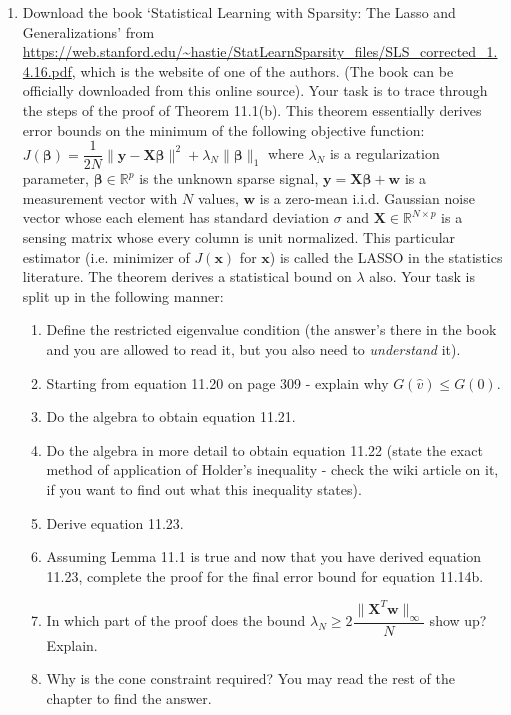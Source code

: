 \documentclass[11pt]{article}
\begin{document}
\begin{enumerate}
\item Download the book `Statistical Learning with Sparsity: The Lasso and Generalizations' from \url{https://web.stanford.edu/~hastie/StatLearnSparsity_files/SLS_corrected_1.4.16.pdf}, which is the website of one of the authors. (The book can be officially downloaded from this online source). Your task is to trace through the steps of the proof of Theorem 11.1(b). This theorem essentially derives error bounds on the minimum of the following objective function: $J(\boldsymbol{\beta}) = \dfrac{1}{2N} \|\boldsymbol{y} - \boldsymbol{X \beta}\|^2 + \lambda_N \|\boldsymbol{\beta}\|_1$ where $\lambda_N$ is a regularization parameter, $\boldsymbol{\beta} \in \mathbb{R}^p$ is the unknown sparse signal, $\boldsymbol{y} = \boldsymbol{X \beta} + \boldsymbol{w}$ is a measurement vector with $N$ values, $\boldsymbol{w}$ is a zero-mean i.i.d. Gaussian noise vector whose each element has standard deviation $\sigma$ and $\boldsymbol{X} \in \mathbb{R}^{N \times p}$ is a sensing matrix whose every column is unit normalized. This particular estimator (i.e. minimizer of $J(\boldsymbol{x})$ for $\boldsymbol{x}$) is called the LASSO in the statistics literature. The theorem derives a statistical bound on $\lambda$ also. Your task is split up in the following manner:
\begin{enumerate}
\item Define the restricted eigenvalue condition (the answer's there in the book and you are allowed to read it, but you also need to \emph{understand} it). 
\item Starting from equation 11.20 on page 309 - explain why $G(\hat{v}) \leq G(0)$.
\item Do the algebra to obtain equation 11.21.
\item Do the algebra in more detail to obtain equation 11.22 (state the exact method of application of Holder's inequality - check the wiki article on it, if you want to find out what this inequality states).
\item Derive equation 11.23.
\item Assuming Lemma 11.1 is true and now that you have derived equation 11.23, complete the proof for the final error bound for equation 11.14b.
\item In which part of the proof does the bound $\lambda_N \geq 2 \dfrac{\|\boldsymbol{X}^T \boldsymbol{w}\|_{\infty}}{N}$ show up? Explain.
\item Why is the cone constraint required? You may read the rest of the chapter to find the answer.

\end{enumerate}
\end{enumerate}
\end{document}
